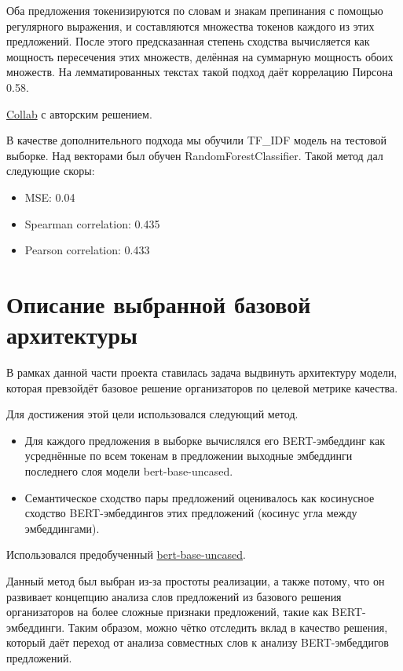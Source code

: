 \documentclass[12pt]{article}
\begin{document}
Оба предложения токенизируются по словам и знакам препинания с помощью регулярного выражения, и составляются множества токенов каждого из этих предложений. После этого предсказанная степень сходства вычисляется как мощность пересечения этих множеств, делённая на суммарную мощность обоих множеств.
На лемматированных текстах такой подход даёт коррелацию Пирсона 0.58.

\href{https://github.com/semantic-textual-relatedness/Semantic_Relatedness_SemEval2024/blob/main/STR_Baseline.ipynb}{Collab} с авторским решением.

В качестве дополнительного подхода мы обучили TF\_IDF модель на тестовой выборке. Над векторами был обучен RandomForestClassifier. Такой метод дал следующие скоры:
\begin{itemize}
    \item MSE: 0.04
    \item Spearman correlation: 0.435
    \item Pearson correlation: 0.433
\end{itemize}

\section{Описание выбранной базовой архитектуры}
В рамках данной части проекта ставилась задача выдвинуть архитектуру модели, которая превзойдёт базовое решение организаторов по целевой метрике качества.

Для достижения этой цели использовался следующий метод.
\begin{itemize}
    \item Для каждого предложения в выборке вычислялся его BERT-эмбеддинг как \\ усреднённые по всем токенам в предложении выходные эмбеддинги последнего слоя модели bert-base-uncased.

    \item Семантическое сходство пары предложений оценивалось как косинусное сходство BERT-эмбеддингов этих предложений (косинус угла между эмбеддингами).
\end{itemize}

Использовался предобученный \href{https://huggingface.co/bert-base-uncased}{bert-base-uncased}.

Данный метод был выбран из-за простоты реализации, а также потому, что он развивает концепцию анализа слов предложений из базового решения организаторов на более сложные признаки предложений, такие как BERT-эмбеддинги. Таким образом, можно чётко отследить вклад в качество решения, который даёт переход от анализа совместных слов к анализу BERT-эмбеддигов предложений.
\end{document}
